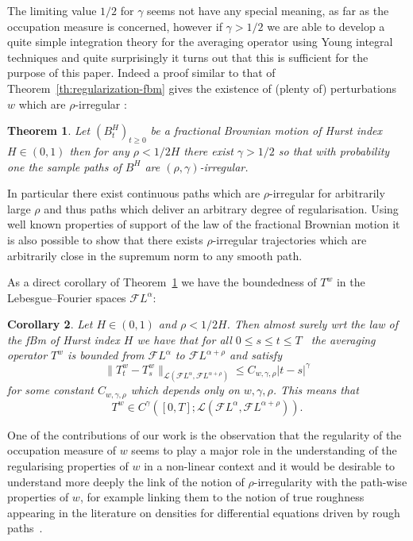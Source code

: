 \documentclass[a4paper,11pt]{article}
\newtheorem{theorem}{Theorem}[section]
\newtheorem{corollary}[theorem]{Corollary}
\newcommand{\CF}{\mathscr F}
\begin{document}
The limiting value $1/2$ for $\gamma$ seems not have any special meaning, as
far as the occupation measure is concerned, however if $\gamma >1/2$ we are
able to develop a quite simple integration theory for the averaging operator
using Young integral techniques and quite surprisingly it turns out that this
is sufficient for the purpose of this paper. Indeed a proof similar to that of
Theorem~\ref{th:regularization-fbm} gives the existence of (plenty of)
perturbations $w$ which are $\rho$-irregular :

\begin{theorem}
  \label{th:irr-for-fbm}Let $(B^{H}_{t} )_{t \geqslant 0}$ be a fractional
  Brownian motion of Hurst index $H \in ( 0,1 )$ then for any $\rho <1/2H$
  there exist $\gamma >1/2$ so that with probability one the sample paths of
  $B^{H}$ are $( \rho , \gamma )$-irregular.
\end{theorem}

In particular there exist continuous paths which are $\rho$-irregular for
arbitrarily large $\rho$ and thus paths which deliver an arbitrary degree of
regularisation. Using well known properties of support of the law of the
fractional Brownian motion it is also possible to show that there exists $\rho$-irregular
trajectories which are arbitrarily close in the supremum norm to any smooth
path.



As a direct corollary of Theorem~\ref{th:irr-for-fbm} we have the boundedness
of $T^{w}$ in the Lebesgue--Fourier spaces $\CF L^{\alpha}$:

\begin{corollary}
  Let $H \in ( 0,1 )$ and $\rho <1/2H$. Then almost surely wrt the law of the
  fBm of Hurst index $H$ we have that for all $0 \leqslant s \leqslant t
  \leqslant T$ \ the averaging operator $T^{w}$ is bounded from $\CF
  L^{\alpha}$ to $\CF L^{\alpha + \rho}$ and satisfy
  \[ \| T^{w}_{t} -T^{w}_{s} \|_{\mathcal{L} \left( \CF L^{\alpha} , \CF
     L^{\alpha + \rho} \right)} \leqslant C_{w, \gamma , \rho} | t-s
     |^{\gamma} \]
  for some constant $C_{w, \gamma , \rho}$ which depends only on $w, \gamma ,
  \rho$. This means that $$T^{w}_{} \in C^{\gamma} \left( [ 0,T ] ;\mathcal{L}
  \left( \CF L^{\alpha} , \CF L^{\alpha + \rho} \right) \right).$$
\end{corollary}

One of the contributions of our work is the observation that the regularity of
the occupation measure of $w$ seems to play a major role in the understanding
of the regularising properties of $w$ in a non-linear context and it would be
desirable to understand more deeply the link of the notion of
$\rho$-irregularity with the path-wise properties of $w$, for example linking
them to the notion of true roughness appearing in the literature on densities
for differential equations driven by rough paths~{\cite{true-roughness}}.
\end{document}
